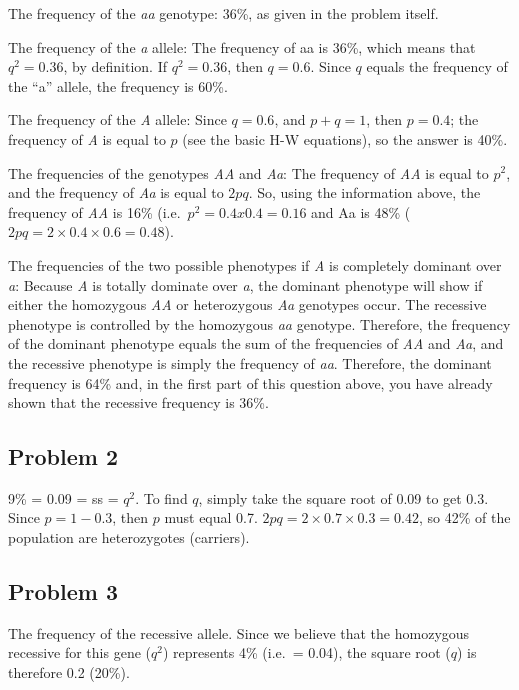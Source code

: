 \documentclass[
  a4paper]{book}
\begin{document}
The frequency of the \emph{aa} genotype: 36\%, as given in the problem itself.

The frequency of the \emph{a} allele: The frequency of aa is 36\%, which means that \(q^2 = 0.36\), by definition. If \(q^2 = 0.36\), then \(q = 0.6\). Since \(q\) equals the frequency of the ``a'' allele, the frequency is 60\%.

The frequency of the \emph{A} allele: Since \(q = 0.6\), and \(p + q = 1\), then \(p = 0.4\); the frequency of \emph{A} is equal to \(p\) (see the basic H-W equations), so the answer is 40\%.

The frequencies of the genotypes \emph{AA} and \emph{Aa}: The frequency of \emph{AA} is equal to \(p^2\), and the frequency of \emph{Aa} is equal to \(2pq\). So, using the information above, the frequency of \emph{AA} is 16\% (i.e.~\(p^2 = 0.4 x 0.4 = 0.16\) and Aa is 48\% (\(2pq = 2 \times 0.4 \times 0.6 = 0.48\)).

The frequencies of the two possible phenotypes if \emph{A} is completely dominant over \emph{a}: Because \emph{A} is totally dominate over \emph{a}, the dominant phenotype will show if either the homozygous \emph{AA} or heterozygous \emph{Aa} genotypes occur. The recessive phenotype is controlled by the homozygous \emph{aa} genotype. Therefore, the frequency of the dominant phenotype equals the sum of the frequencies of \emph{AA} and \emph{Aa}, and the recessive phenotype is simply the frequency of \emph{aa}. Therefore, the dominant frequency is 64\% and, in the first part of this question above, you have already shown that the recessive frequency is 36\%.

\subsection{Problem 2}\label{problem-2}

9\% = 0.09 = ss = \(q^2\). To find \(q\), simply take the square root of 0.09 to get 0.3. Since \(p = 1 - 0.3\), then \(p\) must equal 0.7. \(2pq = 2 \times 0.7 \times 0.3 = 0.42\), so 42\% of the population are heterozygotes (carriers).

\subsection{Problem 3}\label{problem-3}

The frequency of the recessive allele. Since we believe that the homozygous recessive for this gene (\(q^2\)) represents 4\% (i.e.~= 0.04), the square root (\(q\)) is therefore 0.2 (20\%).
\end{document}
